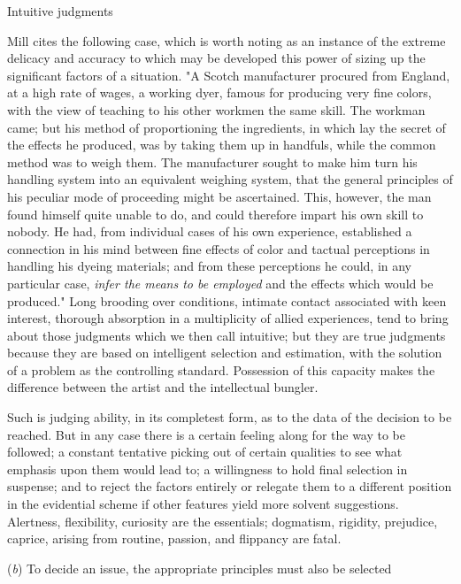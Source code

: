 \documentclass[letterpaper]{book}
\begin{document}
Intuitive judgments

Mill cites the following case, which is worth noting as an instance of
the extreme delicacy and accuracy to which may be developed this power
of sizing up the significant factors of a situation. "A Scotch
manufacturer procured from England, at a high rate of wages, a working
dyer, famous for producing very fine colors, with the view of teaching
to his other workmen the
same
skill. The workman came; but his method of proportioning the
ingredients, in which lay the secret of the effects he produced, was by
taking them up in handfuls, while the common method was to weigh them.
The manufacturer sought to make him turn his handling system into an
equivalent weighing system, that the general principles of his peculiar
mode of proceeding might be ascertained. This, however, the man found
himself quite unable to do, and could therefore impart his own skill to
nobody. He had, from individual cases of his own experience, established
a connection in his mind between fine effects of color and tactual
perceptions in handling his dyeing materials; and from these perceptions
he could, in any particular case, \emph{infer the means to be employed}
and the effects which would be produced." Long brooding over conditions,
intimate contact associated with keen interest, thorough absorption in a
multiplicity of allied experiences, tend to bring about those judgments
which we then call intuitive; but they are true judgments because they
are based on intelligent selection and estimation, with the solution of
a problem as the controlling standard. Possession of this capacity makes
the difference between the artist and the intellectual bungler.

Such is judging ability, in its completest form, as to the data of the
decision to be reached. But in any case there is a certain feeling along
for the way to be followed; a constant tentative picking out of certain
qualities to see what emphasis upon them would lead to; a willingness to
hold final selection in suspense; and to reject the factors entirely or
relegate them to a different position in the evidential scheme if other
features yield more solvent suggestions. Alertness, flexibility,
curiosity
are the essentials; dogmatism, rigidity, prejudice, caprice, arising
from routine, passion, and flippancy are fatal.

(\emph{b}) To decide an issue, the appropriate principles must also be
selected
\end{document}
